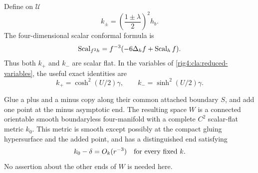 Define on $\mathcal U$
\begin{equation}\label{rig4:cla:conformal-metrics}
 k_\pm=\left(\frac{1\pm\lambda}{2}\right)^2h_b.
\end{equation}
The four-dimensional scalar conformal formula is
\begin{equation}\label{rig4:cla:scalar-transform}
 \operatorname{Scal}_{f^2h}=f^{-3}(-6\Delta_h f+\operatorname{Scal}_h f).
\end{equation}
Thus both $k_+$ and $k_-$ are scalar flat.  In the variables of
\eqref{rig4:cla:reduced-variables}, the useful exact identities are
\begin{equation}\label{rig4:cla:hyperbolic-factors}
 k_+=\cosh^2(U/2)\gamma,
 \qquad k_-=\sinh^2(U/2)\gamma.
\end{equation}

\begin{lemma}\label{rig4:cla:double}
Glue a plus and a minus copy along their common attached boundary $S$,
and add one point at the minus asymptotic end.
The resulting space $W$ is a connected orientable smooth
boundaryless four-manifold with a complete $C^2$ scalar-flat metric
$k_0$.  This metric is smooth except possibly at the compact gluing
hypersurface and the added point, and has a distinguished
end satisfying
\begin{equation}\label{rig4:cla:zero-end}
 k_0-\delta=O_k(r^{-3})
 \quad\hbox{for every fixed }k.
\end{equation}
No assertion about the other ends of $W$ is needed here.
\end{lemma}

